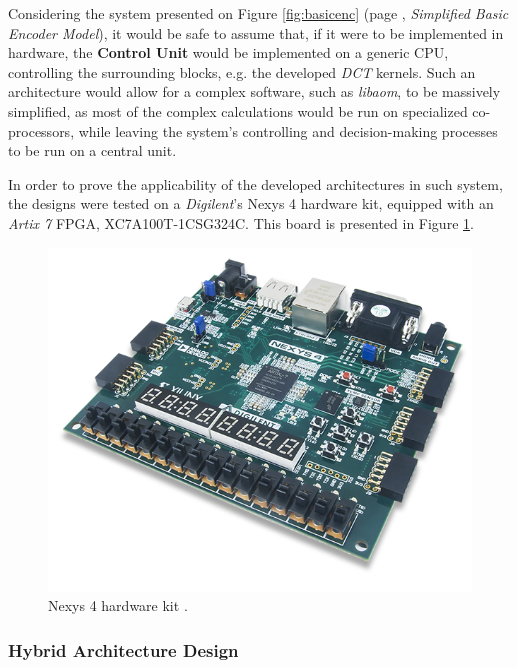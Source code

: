 Considering the system presented on Figure \ref{fig:basicenc} (page \pageref{fig:basicenc}, \emph{Simplified Basic Encoder Model}), it would be safe to assume that, if it were to be implemented in hardware, the \textbf{Control Unit} would be implemented on a generic CPU, controlling the surrounding blocks, e.g. the developed \emph{DCT} kernels. Such an architecture would allow for a complex software, such as \emph{libaom}, to be massively simplified, as most of the complex calculations would be run on specialized co-processors, while leaving the system's controlling and decision-making processes to be run on a central unit.

In order to prove the applicability of the developed architectures in such system, the designs were tested on a \emph{Digilent}'s Nexys 4 hardware kit, equipped with an \emph{Artix 7} FPGA, XC7A100T-1CSG324C. This board is presented in Figure \ref{fig:nexys4}.

\begin{figure}[!htb]
    \centering
    \includegraphics[width=\figwidth]{Sections/4DevelopedArchitecture/Figures/nexys-4-0.png}
    \caption[Nexys 4 hardware kit.]{Nexys 4 hardware kit \cite{NexysArtix7FPGA}.}
    \label{fig:nexys4}
\end{figure}

\subsubsection{Hybrid Architecture Design}

